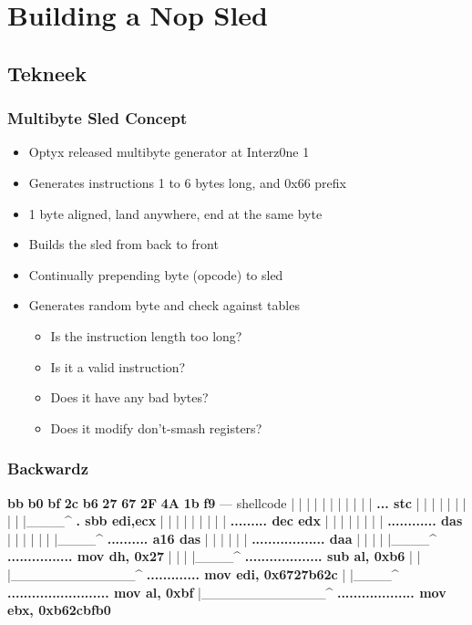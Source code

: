 \documentclass{beamer}
\begin{document}
\section{Building a Nop Sled}

\subsection{Tekneek}

\begin{frame}
  \frametitle{Multibyte Sled Concept}
  \begin{itemize}
    \item Optyx released multibyte generator at Interz0ne 1
    \item Generates instructions 1 to 6 bytes long, and 0x66 prefix
    \item 1 byte aligned, land anywhere, end at the same byte
  \end{itemize}
  \begin{itemize}
    \pause
    \item Builds the sled from back to front
    \item Continually prepending byte (opcode) to sled
    \item Generates random byte and check against tables
    \pause
    \begin{itemize}
      \item Is the instruction length too long?
      \item Is it a valid instruction?
      \item Does it have any bad bytes?
      \item Does it modify don't-smash registers?
    \end{itemize}
  \end{itemize}
\end{frame}

\begin{frame}[fragile]
  \frametitle{Backwardz}
  {\footnotesize
  \begin{semiverbatim}
  \textbf<11>{bb} \textbf<10,11>{b0} \textbf<9,10,11>{bf} \textbf<8,9,11>{2c} \textbf<7,8,9,11>{b6} \textbf<6,7,9>{27} \textbf<5,9>{67} \textbf<4,5>{2F} \textbf<3>{4A} \textbf<2>{1b} \textbf<1,2>{f9} --- shellcode
  |  |  |  |  |  |  |  |  |  |  | \textbf<1>{... stc}
  |  |  |  |  |  |  |  |  |  |____^ \textbf<2>{. sbb edi,ecx}
  |  |  |  |  |  |  |  |  | \textbf<3>{......... dec edx}
  |  |  |  |  |  |  |  | \textbf<4>{............ das}
  |  |  |  |  |  |  |____^ \textbf<5>{.......... a16 das}
  |  |  |  |  |  | \textbf<6>{.................. daa}
  |  |  |  |  |____^ \textbf<7>{................ mov dh, 0x27}
  |  |  |  |____^ \textbf<8>{................... sub al, 0xb6}
  |  |  |_____________^ \textbf<9>{............. mov edi, 0x6727b62c}
  |  |____^ \textbf<10>{......................... mov al, 0xbf}
  |_____________^ \textbf<11>{................... mov ebx, 0xb62cbfb0}
\end{semiverbatim}
}
\end{frame}
\end{document}
